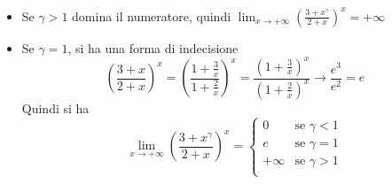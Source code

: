 \documentclass{article}
\begin{document}
\begin{enumerate}[label=\textbf{Esercizio 6.\arabic*.},itemindent=*]
\begin{enumerate}
\begin{itemize}
            \item Se $\gamma>1$ domina il numeratore, quindi $\lim_{x\to +\infty}\left( \frac{3+x^\gamma}{2+x} \right)^x=+\infty$
            \item Se $\gamma=1$, si ha una forma di indecisione 
            \[\left( \frac{3+x}{2+x} \right)^x=\left( \frac{1+\frac{3}{x}}{1+\frac{2}{x}} \right)^x=\frac{\left( {1+\frac{3}{x}}\right)^x}{\left({1+\frac{2}{x}} \right)^x}\to\frac{e^3}{e^2}=e\]
        Quindi si ha
            \[\lim_{x\to +\infty}\left( \frac{3+x^\gamma}{2+x} \right)^x=\begin{cases}
                0&\text{se }\gamma<1\\
                e&\text{se }\gamma=1\\
                +\infty&\text{se }\gamma >1\\
            \end{cases}\]
        \end{itemize}
        

\end{enumerate}
\end{enumerate}
\end{document}
